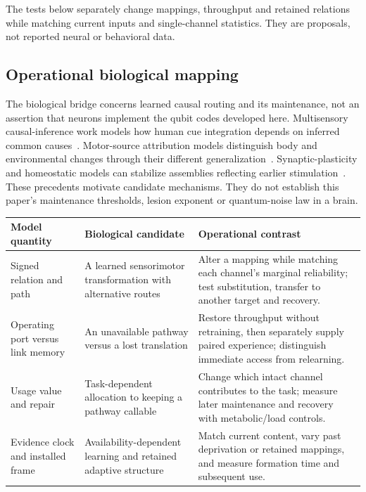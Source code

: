 \documentclass[11pt]{article}
\theoremstyle{definition}
\theoremstyle{remark}
\begin{document}
The tests below separately change mappings, throughput and retained relations while matching current inputs and single-channel statistics. They are proposals, not reported neural or behavioral data.

\subsection{Operational biological mapping}

The biological bridge concerns learned causal routing and its
maintenance, not an assertion that neurons implement the qubit
codes developed here. Multisensory causal-inference work models how human
cue integration depends on inferred common causes~\cite{Kording2007}.
Motor-source attribution models distinguish body and environmental
changes through their different generalization~\cite{Berniker2008}.
Synaptic-plasticity and homeostatic models can stabilize assemblies
reflecting earlier stimulation~\cite{LitwinKumar2014}.
These precedents motivate candidate mechanisms. They do not
establish this paper's maintenance thresholds, lesion exponent or
quantum-noise law in a brain.

\begin{center}\small
\begin{tabular}{@{}>{\raggedright\arraybackslash}p{2.6cm}>{\raggedright\arraybackslash}p{3.5cm}>{\raggedright\arraybackslash}p{7.2cm}@{}}
\toprule
Model quantity & Biological candidate & Operational contrast\\
\midrule
Signed relation and path &
A learned sensorimotor transformation with alternative routes &
Alter a mapping while matching each channel's marginal reliability;
test substitution, transfer to another target and recovery.\\
Operating port versus link memory &
An unavailable pathway versus a lost translation &
Restore throughput without retraining, then separately supply paired
experience; distinguish immediate access from relearning.\\
Usage value and repair &
Task-dependent allocation to keeping a pathway callable &
Change which intact channel contributes to the task; measure later
maintenance and recovery with metabolic/load controls.\\
Evidence clock and installed frame &
Availability-dependent learning and retained adaptive structure &
Match current content, vary past deprivation or retained mappings,
and measure formation time and subsequent use.\\
\bottomrule
\end{tabular}
\end{center}
\end{document}
